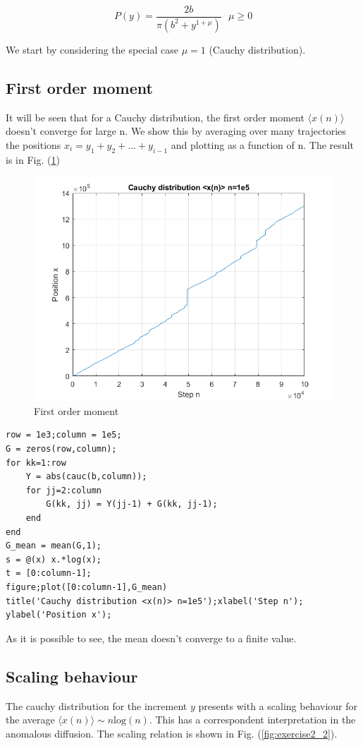 \documentclass[11pt,letterpaper]{article}
\begin{document}
\begin{equation}
P(y) = \frac{2b}{\pi (b^2 + y^{1 + \mu})} \, \, \, \, \mu \geq 0
\end{equation}

We start by considering the special case $\mu = 1$ (Cauchy distribution).\\
\subsection{First order moment}
It will be seen that for a Cauchy distribution, the first order moment $\langle x(n) \rangle$ doesn't converge for large n. We show this by averaging over many trajectories the positions $x_i = y_1 + y_2 + ... + y_{i-1}$ and plotting as a function of n. The result is in Fig. (\ref{fig:exercise2_1})

\begin{figure}
\centering
\includegraphics[width=0.9\linewidth]{./exercise2_1}
\caption{First order moment}
\label{fig:exercise2_1}
\end{figure}

\begin{lstlisting}
row = 1e3;column = 1e5;
G = zeros(row,column);
for kk=1:row
    Y = abs(cauc(b,column));
    for jj=2:column
        G(kk, jj) = Y(jj-1) + G(kk, jj-1);
    end
end
G_mean = mean(G,1);
s = @(x) x.*log(x);
t = [0:column-1];
figure;plot([0:column-1],G_mean)
title('Cauchy distribution <x(n)> n=1e5');xlabel('Step n');
ylabel('Position x');
\end{lstlisting}

As it is possible to see, the mean doesn't converge to a finite value.

\subsection{Scaling behaviour}
The cauchy distribution for the increment $y$ presents with a scaling behaviour for the average $\langle x(n) \rangle \sim n\mathrm{log}(n)$. This has a correspondent interpretation in the anomalous diffusion. The scaling relation is shown in Fig. (\ref{fig:exercise2_2}).
\end{document}
